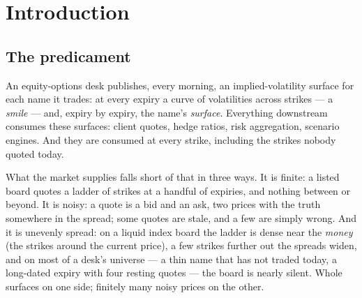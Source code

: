 %
\chapter{Introduction}
\label{ch:introduction}

\section{The predicament}
\label{sec:introproblem}

An equity-options desk publishes, every morning, an implied-volatility
surface for each name it trades: at every expiry a curve of
volatilities across strikes --- a \emph{smile} --- and, expiry by
expiry, the name's \emph{surface}.  Everything downstream consumes
these surfaces: client quotes, hedge ratios, risk aggregation,
scenario engines.  And they are consumed at every strike, including
the strikes nobody quoted today.

What the market supplies falls short of that in three ways.  It is
finite: a listed board quotes a ladder of strikes at a handful of
expiries, and nothing between or beyond.  It is noisy: a quote is a
bid and an ask, two prices with the truth somewhere in the spread;
some quotes are stale, and a few are simply wrong.  And it is
unevenly spread: on a liquid index board the ladder is dense near
the \emph{money} (the strikes around the current price), a few
strikes further out the spreads widen, and on most of a
desk's universe --- a thin name that has not traded today, a
long-dated expiry with four resting quotes --- the board is nearly
silent.
Whole surfaces on one side; finitely many noisy prices on the other.

